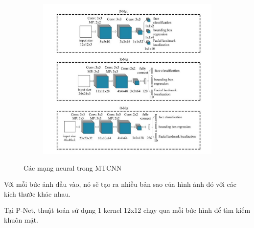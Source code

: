 \begin{figure}
    \begin{subfigure}{1.\textwidth}
        \begin{center}
            \includegraphics[width=1.\linewidth]{Chapters/items/chap2_9.jpg}
        \end{center}
        \label{fig:chap2_9}
    \end{subfigure}
    \caption{Các mạng neural trong MTCNN}
\end{figure}

\newpage
Với mỗi bức ảnh đầu vào, nó sẽ tạo ra nhiều bản sao của hình ảnh đó với các kích thước khác nhau.

Tại P-Net, thuật toán sử dụng 1 kernel 12x12 chạy qua mỗi bức hình để tìm kiếm khuôn mặt.

